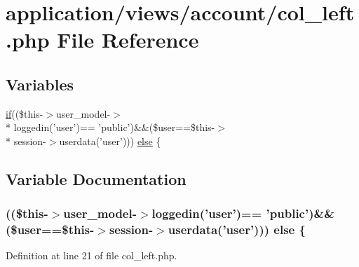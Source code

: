 \hypertarget{col__left_8php}{\section{application/views/account/col\-\_\-left.php File Reference}
\label{col__left_8php}
}
\subsection*{Variables}
\begin{DoxyCompactItemize}
\item 
\hyperlink{bootstrap_8min_8js_afac0f023df4d3c79a9b54c1aae1fbdc3}{if}((\$this-\/$>$user\-\_\-model-\/$>$\\*
loggedin('user')== 'public')\&\&(\$user==\$this-\/$>$\\*
session-\/$>$userdata('user'))) \hyperlink{col__left_8php_a8e01137c8cea5237b8bb23e82170319f}{else} \{
\end{DoxyCompactItemize}


\subsection{Variable Documentation}
\hypertarget{col__left_8php_a8e01137c8cea5237b8bb23e82170319f}{
\subsubsection[{else}]{ ((\$this-\/$>$user\-\_\-model-\/$>$loggedin('user')== 'public')\&\&(\$user==\$this-\/$>$session-\/$>$userdata('user'))) else \{}}\label{col__left_8php_a8e01137c8cea5237b8bb23e82170319f}


Definition at line 21 of file col\-\_\-left.\-php.

